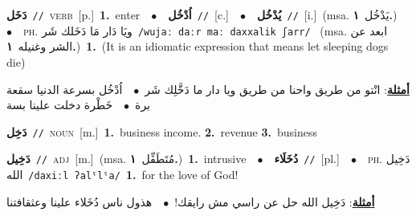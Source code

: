 \documentclass[10pt,a4paper,twoside]{article} %
\begin{document}
\begin{multicols}{2}
{\setlength\topsep{0pt}\textbf{\foreignlanguage{arabic}{دَخَل}}\ {\color{gray}\texttt{//}\color{black}}\ \textsc{verb}\ [p.]\ \textbf{1.}~enter\ \ $\bullet$\ \ \setlength\topsep{0pt}\textbf{\foreignlanguage{arabic}{اُدْخُل}}\ {\color{gray}\texttt{//}\color{black}}\ [c.]\ \ $\bullet$\ \ \setlength\topsep{0pt}\textbf{\foreignlanguage{arabic}{يُدْخُل}}\ {\color{gray}\texttt{//}\color{black}}\ [i.]\ \color{gray}(msa. \foreignlanguage{arabic}{يَدْخُل}~\foreignlanguage{arabic}{\textbf{١.}})\color{black}\ \ $\bullet$\ \ \textsc{ph.} \color{gray} \foreignlanguage{arabic}{ويَا دَار مَا دَخَلك شَر}\color{black}\ {\color{gray}\texttt{/{\sffamily wujaː daːr maː daxxalik ʃarr}/}\color{black}}\ \color{gray} (msa. \foreignlanguage{arabic}{ابعد عن الشر وغنيله}~\foreignlanguage{arabic}{\textbf{١.}})\color{black}\ \textbf{1.}~(It is an idiomatic expression that means let sleeping dogs die)\  \begin{flushright}\color{gray}\foreignlanguage{arabic}{\textbf{\underline{\foreignlanguage{arabic}{أمثلة}}}: انْتو من طريق واحنا من طريق ويا دار ما دَخَّلِك شَر\ $\bullet$\ \  اُدْخُل بسرعة الدنيا سقعة برة\ $\bullet$\ \  خَطْرة دخلت علينا بسة}\end{flushright}\color{black}} \vspace{2mm}

{\setlength\topsep{0pt}\textbf{\foreignlanguage{arabic}{دَخِل}}\ {\color{gray}\texttt{//}\color{black}}\ \textsc{noun}\ [m.]\ \textbf{1.}~business income.  \textbf{2.}~revenue  \textbf{3.}~business\ } \vspace{2mm}

{\setlength\topsep{0pt}\textbf{\foreignlanguage{arabic}{دَخِيل}}\ {\color{gray}\texttt{//}\color{black}}\ \textsc{adj}\ [m.]\ \color{gray}(msa. \foreignlanguage{arabic}{مُتَطَفِّل}~\foreignlanguage{arabic}{\textbf{١.}})\color{black}\ \textbf{1.}~intrusive\ \ $\bullet$\ \ \setlength\topsep{0pt}\textbf{\foreignlanguage{arabic}{دُخَلَاء}}\ {\color{gray}\texttt{//}\color{black}}\ [pl.]\ \ $\bullet$\ \ \textsc{ph.} \color{gray} \foreignlanguage{arabic}{دَخِيل الله}\color{black}\ {\color{gray}\texttt{/{\sffamily daxiːl ʔalˤlˤa}/}\color{black}}\ \textbf{1.}~for the love of God!\  \begin{flushright}\color{gray}\foreignlanguage{arabic}{\textbf{\underline{\foreignlanguage{arabic}{أمثلة}}}: دَخِيل الله حل عن راسي مش رايقك!\ $\bullet$\ \  هذول ناس دُخَلاء علينا وعثقافتنا}\end{flushright}\color{black}} \vspace{2mm}


\end{multicols}
\end{document}
